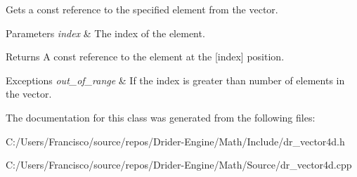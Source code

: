 Gets a const reference to the specified element from the vector.


\begin{DoxyParams}{Parameters}
{\em index} & The index of the element.\\
\hline
\end{DoxyParams}
\begin{DoxyReturn}{Returns}
A const reference to the element at the \mbox{[}index\mbox{]} position.
\end{DoxyReturn}

\begin{DoxyExceptions}{Exceptions}
{\em out\+\_\+of\+\_\+range} & If the index is greater than number of elements in the vector. \\
\hline
\end{DoxyExceptions}


The documentation for this class was generated from the following files\+:\begin{DoxyCompactItemize}
\item 
C\+:/\+Users/\+Francisco/source/repos/\+Drider-\/\+Engine/\+Math/\+Include/dr\+\_\+vector4d.\+h\item 
C\+:/\+Users/\+Francisco/source/repos/\+Drider-\/\+Engine/\+Math/\+Source/dr\+\_\+vector4d.\+cpp\end{DoxyCompactItemize}
